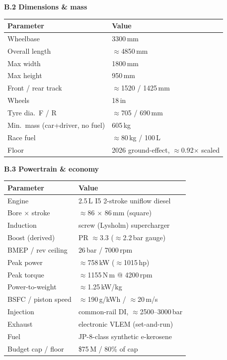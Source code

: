 \documentclass[11pt]{article}
\begin{document}
{\begin{center}
\begin{minipage}[t]{0.48\textwidth}\centering
\textbf{B.2 Dimensions \& mass}\\[2pt]
\begin{tabular}{@{}p{} p{}@{}}
\toprule
\textbf{Parameter} & \textbf{Value}\\
\midrule
Wheelbase & 3300\,mm\\
Overall length & $\approx$4850\,mm\\
Max width & 1800\,mm\\
Max height & 950\,mm\\
Front / rear track & $\approx$1520 / 1425\,mm\\
Wheels & 18\,in\\
Tyre dia.\ F / R & $\approx$705 / 690\,mm\\
Min.\ mass (car+driver, no fuel) & 605\,kg\\
Race fuel & $\approx$80\,kg / 100\,L\\
Floor & 2026 ground-effect, $\approx$0.92$\times$ scaled\\
\bottomrule
\end{tabular}
\end{minipage}\hfill
\begin{minipage}[t]{0.48\textwidth}\centering
\textbf{B.3 Powertrain \& economy}\\[2pt]
\begin{tabular}{@{}p{} p{}@{}}
\toprule
\textbf{Parameter} & \textbf{Value}\\
\midrule
Engine & 2.5\,L I5 2-stroke uniflow diesel\\
Bore $\times$ stroke & $\approx$86 $\times$ 86\,mm (square)\\
Induction & screw (Lysholm) supercharger\\
Boost (derived) & PR $\approx$3.3 ($\approx$2.2\,bar gauge)\\
BMEP / rev ceiling & 26\,bar / 7000\,rpm\\
Peak power & $\approx$758\,kW ($\approx$1015\,hp)\\
Peak torque & $\approx$1155\,N\,m @ 4200\,rpm\\
Power-to-weight & $\approx$1.25\,kW/kg\\
BSFC / piston speed & $\approx$190\,g/kWh / $\approx$20\,m/s\\
Injection & common-rail DI, $\approx$2500--3000\,bar\\
Exhaust & electronic VLEM (set-and-run)\\
Fuel & JP-8-class synthetic e-kerosene\\
Budget cap / floor & \$75\,M / 80\% of cap\\
\bottomrule
\end{tabular}
\end{minipage}
\end{center}}
\end{document}
